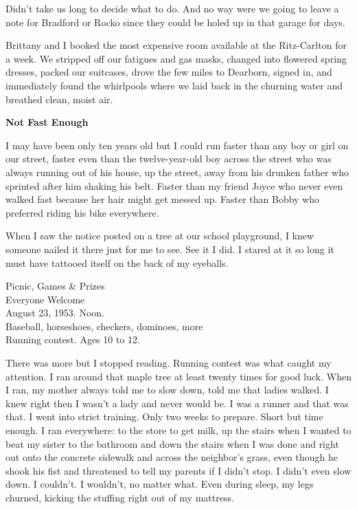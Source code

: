 \documentclass[
]{article}
\begin{document}
Didn't take us long to decide what to do. And no way were we going to
leave a note for Bradford or Rocko since they could be holed up in that
garage for days.

Brittany and I booked the most expensive room available at the
Ritz-Carlton for a week. We stripped off our fatigues and gas masks,
changed into flowered spring dresses, packed our suitcases, drove the
few miles to Dearborn, signed in, and immediately found the whirlpools
where we laid back in the churning water and breathed clean, moist air.

\textbf{\hfill\break
}

\textbf{Not Fast Enough}

I may have been only ten years old but I could run faster than any boy
or girl on our street, faster even than the twelve-year-old boy across
the street who was always running out of his house, up the street, away
from his drunken father who sprinted after him shaking his belt. Faster
than my friend Joyce who never even walked fast because her hair might
get messed up. Faster than Bobby who preferred riding his bike
everywhere.

When I saw the notice posted on a tree at our school playground, I knew
someone nailed it there just for me to see. See it I did. I stared at it
so long it must have tattooed itself on the back of my eyeballs.

Picnic, Games \& Prizes\\
Everyone Welcome\\
August 23, 1953. Noon.\\
Baseball, horseshoes, checkers, dominoes, more\\
Running contest. Ages 10 to 12.

There was more but I stopped reading. Running contest was what caught my
attention. I ran around that maple tree at least twenty times for good
luck. When I ran, my mother always told me to slow down, told me that
ladies walked. I knew right then I wasn't a lady and never would be. I
was a runner and that was that. I went into strict training. Only two
weeks to prepare. Short but time enough. I ran everywhere: to the store
to get milk, up the stairs when I wanted to beat my sister to the
bathroom and down the stairs when I was done and right out onto the
concrete sidewalk and across the neighbor's grass, even though he shook
his fist and threatened to tell my parents if I didn't stop. I didn't
even slow down. I couldn't. I wouldn't, no matter what. Even during
sleep, my legs churned, kicking the stuffing right out of my mattress.
\end{document}
